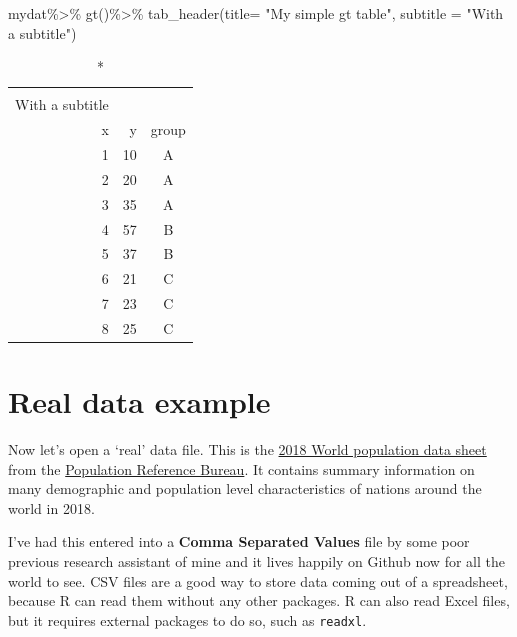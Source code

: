 \documentclass[
]{book}
\newenvironment{Shaded}{\begin{snugshade}}{\end{snugshade}}
\newcommand{\AttributeTok}[1]{\textcolor[rgb]{0.77,0.63,0.00}{#1}}
\newcommand{\FunctionTok}[1]{\textcolor[rgb]{0.00,0.00,0.00}{#1}}
\newcommand{\NormalTok}[1]{#1}
\newcommand{\SpecialCharTok}[1]{\textcolor[rgb]{0.00,0.00,0.00}{#1}}
\newcommand{\StringTok}[1]{\textcolor[rgb]{0.31,0.60,0.02}{#1}}
\begin{document}
\begin{Shaded}
\begin{Highlighting}[]
\NormalTok{mydat}\SpecialCharTok{\%\textgreater{}\%}
  \FunctionTok{gt}\NormalTok{()}\SpecialCharTok{\%\textgreater{}\%}
  \FunctionTok{tab\_header}\NormalTok{(}\AttributeTok{title=} \StringTok{"My simple gt table"}\NormalTok{,}
             \AttributeTok{subtitle =} \StringTok{"With a subtitle"}\NormalTok{)}
\end{Highlighting}
\end{Shaded}

\captionsetup[table]{labelformat=empty,skip=1pt}
\begin{longtable}{rrc}
\caption*{
{\large My simple gt table} \\ 
{\small With a subtitle}
} \\ 
\toprule
x & y & group \\ 
\midrule
1 & 10 & A \\ 
2 & 20 & A \\ 
3 & 35 & A \\ 
4 & 57 & B \\ 
5 & 37 & B \\ 
6 & 21 & C \\ 
7 & 23 & C \\ 
8 & 25 & C \\ 
 \bottomrule
\end{longtable}

\hypertarget{real-data-example}{%
\section{Real data example}\label{real-data-example}}

Now let's open a `real' data file. This is the \href{https://www.prb.org/2018-world-population-data-sheet-with-focus-on-changing-age-structures/}{2018 World population
data
sheet}
from the \href{http://www.prb.org}{Population Reference Bureau}. It contains
summary information on many demographic and population level
characteristics of nations around the world in 2018.

I've had this entered into a \textbf{Comma Separated Values} file by some
poor previous research assistant of mine and it lives happily on Github
now for all the world to see. CSV files are a good way to store data
coming out of a spreadsheet, because R can read them without any other
packages. R can also read Excel files, but it requires external packages
to do so, such as \texttt{readxl}.
\end{document}
